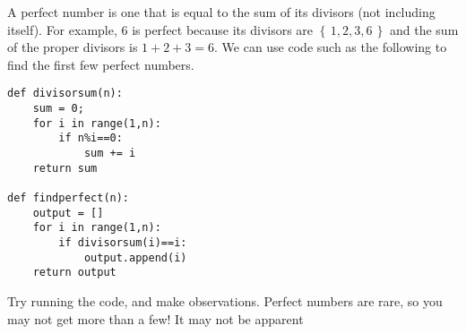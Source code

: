 \documentclass[12pt]{exam}
\newcommand{\set}[1]{\left\{\,#1\,\right\}}
\begin{document}
\begin{questions}
  \question A perfect number is one that is equal to the sum of its divisors (not including itself). For example, 6 is perfect because its divisors are $\set{1,2,3,6}$ and the sum of the proper divisors is $1+2+3=6$. We can use code such as the following to find the first few perfect numbers.
  
  \begin{lstlisting}
def divisorsum(n):
    sum = 0;
    for i in range(1,n):
        if n%i==0:
            sum += i
    return sum

def findperfect(n):
    output = []
    for i in range(1,n):
        if divisorsum(i)==i:
            output.append(i)
    return output
  \end{lstlisting}
  
  Try running the code, and make observations. Perfect numbers are rare, so you may not get more than a few!
  \newpage
  \question It may not be apparent
\end{questions}
\end{document}
